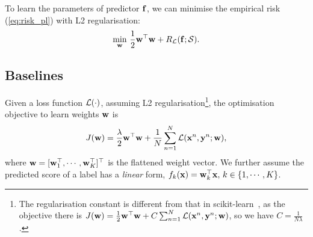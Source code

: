 To learn the parameters of predictor $\mathbf{f}$, we can minimise the empirical risk (\ref{eq:risk_pl}) with L2 regularisation:
\begin{equation}
\label{eq:minrisk_l2}
\min_{\mathbf{w}} \, \frac{1}{2} \mathbf{w}^\top \mathbf{w} + R_{\mathcal{L}}(\mathbf{f}; \mathcal{S}).
\end{equation}


\subsection{Baselines}


Given a loss function $\mathcal{L}(\cdot)$, assuming L2 regularisation\footnote{
The regularisation constant is different from that in scikit-learn~\cite{sklearn-guide}, 
as the objective there is $J(\mathbf{w}) = \frac{1}{2}\mathbf{w}^\top \mathbf{w} + C \sum_{n=1}^N \mathcal{L}(\mathbf{x}^n, \mathbf{y}^n; \mathbf{w})$, so we have $C = \frac{1}{N \lambda}$.},
the optimisation objective to learn weights $\mathbf{w}$ is
\begin{equation}
\label{eq:obj}
J(\mathbf{w}) = \frac{\lambda}{2}\mathbf{w}^\top \mathbf{w} + \frac{1}{N} \sum_{n=1}^N \mathcal{L}(\mathbf{x}^n, \mathbf{y}^n; \mathbf{w}),
\end{equation}
where $\mathbf{w} = [\mathbf{w}_1^\top, \cdots, \mathbf{w}_K^\top]^\top$ is the flattened weight vector.
We further assume the predicted score of a label has a \emph{linear} form, \ie $f_k(\mathbf{x}) = \mathbf{w}_k^\top \mathbf{x}, \, k \in \{1,\cdots,K\}$.



